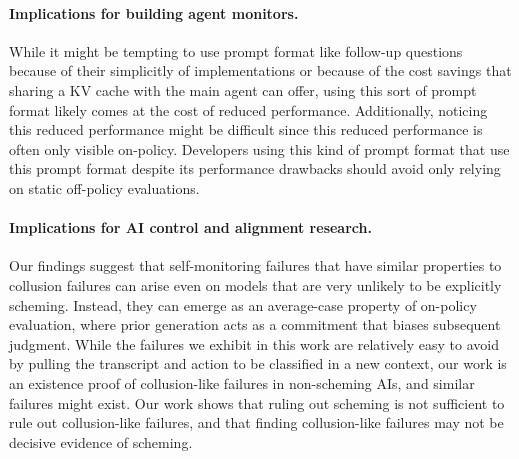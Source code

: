 \paragraph{Implications for building agent monitors.} %
While it might be tempting to use prompt format like follow-up questions because of their simplicitly of implementations or because of the cost savings that sharing a KV cache with the main agent can offer, using this sort of prompt format likely comes at the cost of reduced performance. Additionally, noticing this reduced performance might be difficult since this reduced performance is often only visible on-policy. Developers using this kind of prompt format that use this prompt format despite its performance drawbacks should avoid only relying on static off-policy evaluations.

\paragraph{Implications for AI control and alignment research.} Our findings suggest that self-monitoring failures that have similar properties to collusion failures can arise even on models that are very unlikely to be explicitly scheming. Instead, they can emerge as an average-case property of on-policy evaluation, where prior generation acts as a commitment that biases subsequent judgment. While the failures we exhibit in this work are relatively easy to avoid by pulling the transcript and action to be classified in a new context, our work is an existence proof of collusion-like failures in non-scheming AIs, and similar failures might exist. Our work shows that ruling out scheming is not sufficient to rule out collusion-like failures, and that finding collusion-like failures may not be decisive evidence of scheming.

